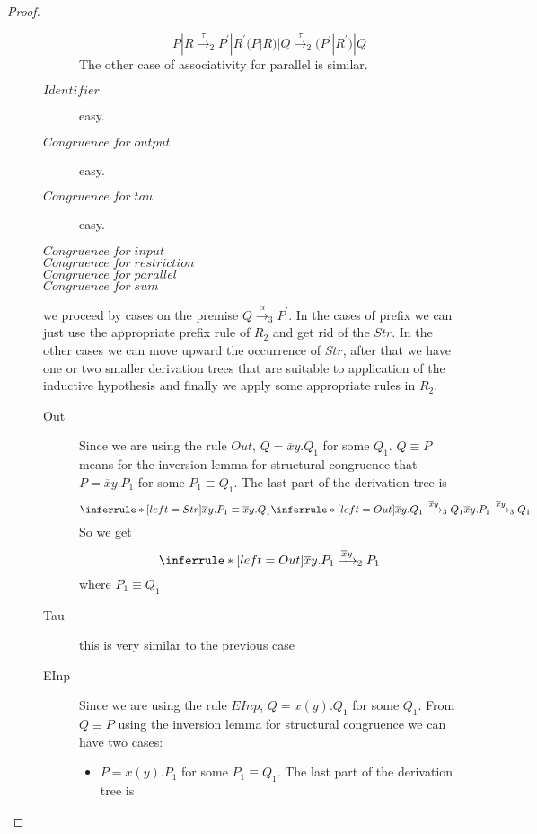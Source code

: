 \begin{theorem}
\begin{proof}
\begin{description}
\begin{description}
\[{{		}{
		  P|R \xrightarrow{\tau}_{2} P^{'}|R^{'}
	    }}{
		(P|R)|Q \xrightarrow{\tau}_{2} (P^{'}|R^{'})|Q
	    }\]
	    The other case of associativity for parallel is similar.
	  \item[$Identifier$]
	    easy.
	  \item[$Congruence\; for\; output$]
	    easy.
	  \item[$Congruence\; for\; tau$]
	    easy.
	  \item[$Congruence\; for\; input$]
	  \item[$Congruence\; for\; restriction$]
	  \item[$Congruence\; for\; parallel$]
	  \item[$Congruence\; for\; sum$]
	\end{description}
		we proceed by cases on the premise $Q\xrightarrow{\alpha}_{3}P^{'}$. In the cases of prefix we can just use the appropriate prefix rule of $R_{2}$ and get rid of the $Str$. In the other cases we can move upward the occurrence of $Str$, after that we have one or two smaller derivation trees that are suitable to application of the inductive hypothesis and finally we apply some appropriate rules in $R_{2}$.
		\begin{description}
		  \item[Out]
		    Since we are using the rule $Out$, $Q=\overline{x}y.Q_{1}$ for some $Q_{1}$. $Q\equiv P$ means for the inversion lemma for structural congruence that $P=\overline{x}y.P_{1}$ for some $P_{1}\equiv Q_{1}$. The last part of the derivation tree is 
		    \[
		      \inferrule* [left=Str]{
			  \overline{x}y.P_{1}\equiv \overline{x}y.Q_{1}
			\\
			  \inferrule* [left=Out]{
			  }{
			    \overline{x}y.Q_{1}\xrightarrow{\overline{x}y}_{3}Q_{1}
			  }
		      }{
			\overline{x}y.P_{1}\xrightarrow{\overline{x}y}_{3}Q_{1}
		      }
		    \]
		    So we get 
		    \[
		      \inferrule* [left=Out]{
		      }{
			\overline{x}y.P_{1}\xrightarrow{\overline{x}y}_{2}P_{1}
		      }
		    \]
		    where $P_{1}\equiv Q_{1}$
		  \item[Tau] this is very similar to the previous case
		  \item[EInp]
		    Since we are using the rule $EInp$, $Q=x(y).Q_{1}$ for some $Q_{1}$. From $Q\equiv P$ using the inversion lemma for structural congruence we can have two cases:
		    \begin{itemize}
		      \item 
			$P=x(y).P_{1}$ for some $P_{1}\equiv Q_{1}$. The last part of the derivation tree is 

\end{itemize}
\end{description}
\end{description}
\end{proof}
\end{theorem}
